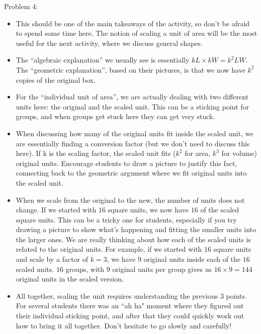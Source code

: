 \documentclass[nooutcomes,noauthor, handout]{ximera}
\begin{document}
\begin{instructorNotes}
Problem 4:
\begin{itemize}
\item This should be one of the main takeaways of the activity, so don't be afraid to spend some time here.  The notion of scaling a unit of area will be the most useful for the next activity, where we discuss general shapes.  

\item The ``algebraic explanation'' we usually see is essentially $k L \times k W = k^2 LW$.  The ``geometric explanation'', based on their pictures, is that we now have $k^2$ copies of the original box.

\item For the ``individual unit of area'', we are actually dealing with two different units here: the original and the scaled unit. This can be a sticking point for groups, and when groups get stuck here they can get very stuck.

\item When discussing how many of the original units fit inside the scaled unit, we are essentially finding a conversion factor (but we don't need to discuss this here). If k is the scaling factor, the scaled unit fits ($k^2$ for area, $k^3$ for volume) original units. Encourage students to draw a picture to justify this fact, connecting back to the geometric argument where we fit original units into the scaled unit.

\item When we scale from the original to the new, the number of units does not change. If we started with $16$ square units, we now have $16$ of the scaled square units. This can be a tricky one for students, especially if you try drawing a picture to show what's happening and fitting the smaller units into the larger ones. We are really thinking about how each of the scaled units is related to the original units. For example, if we started with $16$ square units and scale by a factor of $k=3$, we have $9$ original units inside each of the $16$ scaled units. $16$ groups, with $9$ original units per group gives us $16 \times 9 = 144$ original units in the scaled version.

\item All together, scaling the unit requires understanding the previous 3 points. For several students there was an ``ah ha" moment where they figured out their individual sticking point, and after that they could quickly work out how to bring it all together. Don't hesitate to go slowly and carefully!



\end{itemize}
\end{instructorNotes}
\end{document}

